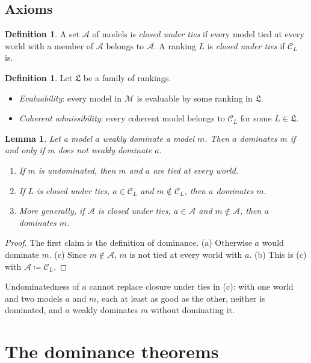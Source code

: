 \documentclass[11pt]{article}
\newtheorem{lemma}[theorem]{Lemma}
\theoremstyle{definition}
\newtheorem{definition}[theorem]{Definition}
\newcommand{\M}{\mathcal M}
\newcommand{\C}{\mathcal C}
\newcommand{\Lf}{\mathfrak L}
\begin{document}
\subsection{Axioms}

\begin{definition}\label{def:tie-closure}
A set $\mathcal A$ of models is \emph{closed under ties} if every model tied at every world with a member of $\mathcal A$ belongs to $\mathcal A$. A ranking $L$ is \emph{closed under ties} if $\C_L$ is.
\end{definition}

\begin{definition}\label{def:family-assumptions}
Let $\Lf$ be a family of rankings.
\begin{itemize}[leftmargin=*]
\item \emph{Evaluability}: every model in $\M$ is evaluable by some ranking in $\Lf$.
\item \emph{Coherent admissibility}: every coherent model belongs to $\C_L$ for some $L\in\Lf$.
\end{itemize}
\end{definition}

\begin{lemma}\label{lem:ties}
Let a model $a$ weakly dominate a model $m$. Then $a$ dominates $m$ if and only if $m$ does not weakly dominate $a$.
\begin{enumerate}[label=(\alph*)]
\item If $m$ is undominated, then $m$ and $a$ are tied at every world.
\item If $L$ is closed under ties, $a\in\C_L$ and $m\notin\C_L$, then $a$ dominates $m$.
\item More generally, if $\mathcal A$ is closed under ties, $a\in\mathcal A$ and $m\notin\mathcal A$, then $a$ dominates $m$.
\end{enumerate}
\end{lemma}
\begin{proof}
The first claim is the definition of dominance. (a) Otherwise $a$ would dominate $m$. (c) Since $m\notin\mathcal A$, $m$ is not tied at every world with $a$. (b) This is (c) with $\mathcal A\coloneqq\C_L$.
\end{proof}
Undominatedness of $a$ cannot replace closure under ties in (c): with one world and two models $a$ and $m$, each at least as good as the other, neither is dominated, and $a$ weakly dominates $m$ without dominating it.

\section{The dominance theorems}\label{sec:general}
\end{document}
